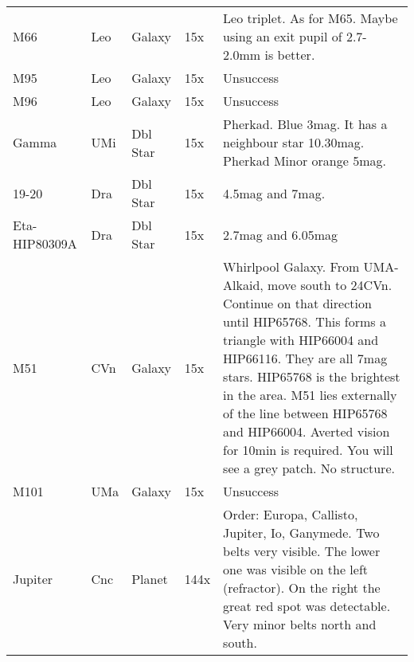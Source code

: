 \begin{longtable}{ p{0.7in}  p{0.3in}  p{0.6in}  p{0.9in}  p{5.8in} }
M66 & Leo & Galaxy & 15x & Leo triplet. As for M65. Maybe using an exit pupil of 2.7-2.0mm is better. \\ 
M95 & Leo & Galaxy & 15x & Unsuccess \\ 
M96 & Leo & Galaxy & 15x & Unsuccess \\ 
Gamma & UMi & Dbl Star & 15x & Pherkad. Blue 3mag. It has a neighbour star 10.30mag. Pherkad Minor orange 5mag. \\ 
19-20 & Dra & Dbl Star & 15x & 4.5mag and 7mag. \\ 
Eta-HIP80309A & Dra & Dbl Star & 15x & 2.7mag and 6.05mag \\ 
M51 & CVn & Galaxy & 15x & Whirlpool Galaxy. From UMA-Alkaid, move south to 24CVn. Continue on that direction until HIP65768. This forms a triangle with HIP66004 and HIP66116. They are all 7mag stars. HIP65768 is the brightest in the area. M51 lies externally of the line between HIP65768 and HIP66004. Averted vision for 10min is required. You will see a grey patch. No structure. \\ 
M101 & UMa & Galaxy & 15x & Unsuccess \\ 
Jupiter & Cnc & Planet & 144x & Order: Europa, Callisto, Jupiter, Io, Ganymede. Two belts very visible. The lower one was visible on the left (refractor). On the right the great red spot was detectable. Very minor belts north and south.  \\ 
\hline 
\end{longtable} 
